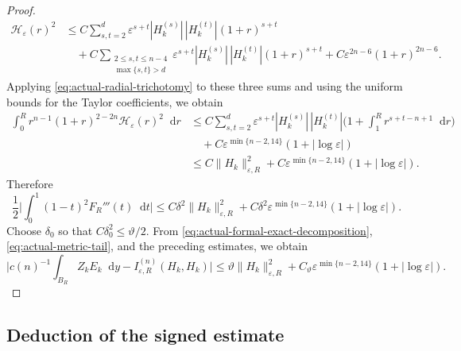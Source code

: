 \documentclass[11pt]{article}
\numberwithin{equation}{section}
\theoremstyle{remark}
\newcommand{\dd}{\mathop{}\!\mathrm{d}}
\begin{document}
\begin{proof}
{\begin{equation*}
\begin{aligned}
 \mathcal H_\varepsilon(r)^2
 &\le C\sum_{s,t=2}^d\varepsilon^{s+t}
 |H_k^{(s)}|\,|H_k^{(t)}|(1+r)^{s+t}\\
 &\quad+C\sum_{\substack{2\le s,t\le n-4\\\max\{s,t\}>d}}
 \varepsilon^{s+t}|H_k^{(s)}|\,|H_k^{(t)}|(1+r)^{s+t}
 +C\varepsilon^{2n-6}(1+r)^{2n-6}.
\end{aligned}
\end{equation*}
}
Applying \eqref{eq:actual-radial-trichotomy} to these three sums and using
the uniform bounds for the Taylor coefficients, we obtain
{
\begin{align*}
 \int_0^Rr^{n-1}(1+r)^{2-2n}
 \mathcal H_\varepsilon(r)^2\dd r
 &\le C\sum_{s,t=2}^d\varepsilon^{s+t}
 |H_k^{(s)}|\,|H_k^{(t)}|
 \bigg(1+\int_1^Rr^{s+t-n+1}\dd r\bigg)\\
 &\quad+C\varepsilon^{\min\{n-2,14\}}
 (1+|\log\varepsilon|)\\
 &\le C\|H_k\|_{\varepsilon,R}^2
 +C\varepsilon^{\min\{n-2,14\}}
 (1+|\log\varepsilon|).
\end{align*}
}
Therefore
{
\begin{equation*}
 \frac12\Big|\int_0^1(1-t)^2F_R'''(t)\dd t\Big|
 \le C\delta^2\|H_k\|_{\varepsilon,R}^2
 +C\delta^2\varepsilon^{\min\{n-2,14\}}
 (1+|\log\varepsilon|).
\end{equation*}
}
Choose $\delta_0$ so that $C\delta_0^2\le\vartheta/2$.  From
\eqref{eq:actual-formal-exact-decomposition},
\eqref{eq:actual-metric-tail}, and the  preceding estimates, we obtain
{
\begin{equation*}
 \Bigg|c(n)^{-1}\int_{B_R}Z_kE_k\dd y
 -I_{\varepsilon,R}^{(n)}(H_k,H_k)\Bigg|
 \le\vartheta\|H_k\|_{\varepsilon,R}^2
 +C_\vartheta\varepsilon^{\min\{n-2,14\}}
 (1+|\log\varepsilon|).
\end{equation*}
}
\end{proof}

\subsection*{Deduction of the signed estimate}
\end{document}

